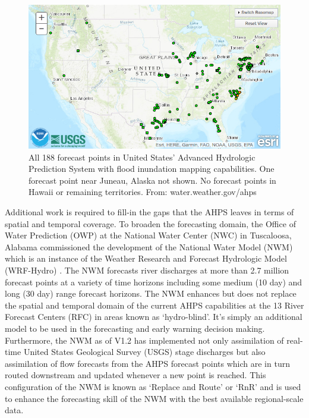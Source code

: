 \begin{figure}[h!]
\centering
\includegraphics[scale=2.0]{figs/ahps_fim_forecast_points_conus.jpg}
\caption{All 188 forecast points in United States' Advanced Hydrologic Prediction System with flood inundation mapping capabilities. One forecast point near Juneau, Alaska not shown. No forecast points in Hawaii or remaining territories. From: water.weather.gov/ahps}
\label{fig:fim_ahps_points}
\end{figure}

Additional work is required to fill-in the gaps that the AHPS leaves in terms of spatial and temporal coverage.
To broaden the forecasting domain, the Office of Water Prediction (OWP) at the National Water Center (NWC) in Tuscaloosa, Alabama commissioned the development of the National Water Model (NWM) which is an instance of the Weather Research and Forecast Hydrologic Model (WRF-Hydro) \cite{gochis2018wrf,cosgrove2019evolution}. 
The NWM forecasts river discharges at more than 2.7 million forecast points at a variety of time horizons including some medium (10 day) and long (30 day) range forecast horizons.
The NWM enhances but does not replace the spatial and temporal domain of the current AHPS capabilities at the 13 River Forecast Centers (RFC) in areas known as `hydro-blind'. 
It's simply an additional model to be used in the forecasting and early warning decision making.
Furthermore, the NWM as of V1.2 has implemented not only assimilation of real-time United States Geological Survey (USGS) stage discharges but also assimilation of flow forecasts from the AHPS forecast points which are in turn routed downstream and updated whenever a new point is reached. This configuration of the NWM is known as `Replace and Route' or `RnR' and is used to enhance the forecasting skill of the NWM with the best available regional-scale data.


